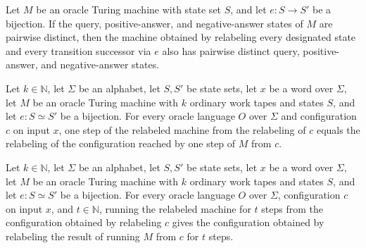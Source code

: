 \begin{theorem}
\label{Turing.OracleTM.relabel_wellFormed}
\leanok
{}
Let $M$ be an oracle Turing machine with state set $S$, and let $e:S\to S'$ be a
bijection. If the query, positive-answer, and negative-answer states of $M$ are pairwise
distinct, then the machine obtained by relabeling every designated state and every
transition successor via $e$ also has pairwise distinct query, positive-answer, and
negative-answer states.
\end{theorem}

\begin{theorem}
\label{Turing.OracleTM.relabel_step}
\leanok
{}
Let $k\in\mathbb{N}$, let $\Sigma$ be an alphabet, let $S,S'$ be state sets, let $x$ be
a word over $\Sigma$, let $M$ be an oracle Turing machine with $k$ ordinary work tapes
and states $S$, and let $e\colon S\simeq S'$ be a bijection. For every oracle language
$O$ over $\Sigma$ and configuration $c$ on input $x$, one step of the relabeled machine
from the relabeling of $c$ equals the relabeling of the configuration reached by one
step of $M$ from $c$.
\end{theorem}

\begin{theorem}
\label{Turing.OracleTM.relabel_runFrom}
\leanok
{}
Let $k\in\mathbb{N}$, let $\Sigma$ be an alphabet, let $S,S'$ be state sets, let $x$ be
a word over $\Sigma$, let $M$ be an oracle Turing machine with $k$ ordinary work tapes
and states $S$, and let $e\colon S\simeq S'$ be a bijection. For every oracle language
$O$ over $\Sigma$, configuration $c$ on input $x$, and $t\in\mathbb{N}$, running the
relabeled machine for $t$ steps from the configuration obtained by relabeling $c$ gives
the configuration obtained by relabeling the result of running $M$ from $c$ for $t$
steps.
\end{theorem}

